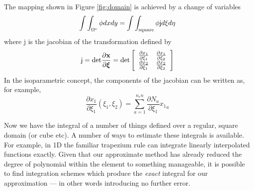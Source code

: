 \documentclass[10pt]{article}
\newcommand{\curly}{\sf }
\begin{document}
		The mapping shown in Figure \ref{fig:domain} is achieved by
		a change of variables 
			\begin{equation}
				\int  \int_{\Omega^e} \phi dx dy = \int  \int_{\rm square} \phi {\curly j} d \xi d \eta
			\end{equation}
		where {\curly j} is the jacobian of the transformation defined by
			\begin{equation}
				 {\curly j} = {\rm det} \frac{\partial \mathbf{x}}{\partial \boldsymbol{\xi}} = 
				 	{\rm det} \left[ \begin{array}{cc}  
				 		\frac{\partial x_1}{\partial \xi_1} &  \frac{\partial x_1}{\partial \xi_2} \\
				 		\frac{\partial x_2}{\partial \xi_1} &  \frac{\partial x_2}{\partial \xi_2}
				 		\end{array}    \right]
			\end{equation}
		In the isoparametric concept, the components of the jacobian can be written as,
		for example,  
			\begin{equation}
			   \frac{\partial x_1}{\partial \xi_1} (\xi_1,\xi_2) = \sum_{a=1}^{n_en} \frac{\partial N_a}{\partial \xi_1} {x_1}_a
			\end{equation}
			
	Now we have the integral of a number of things defined over
	a regular, square domain (or cube etc).  A number of ways
	to estimate these integrals is available. For example, in
	1D the familiar trapezium rule can integrate linearly interpolated
	functions exactly. Given that our approximate method has
	already reduced the degree of polynomial within the element
	to something manageable, it is possible to find integration
	schemes which produce the {\em exact} integral for our
	approximation --- in other words introducing no further error.	
		
\end{document}
